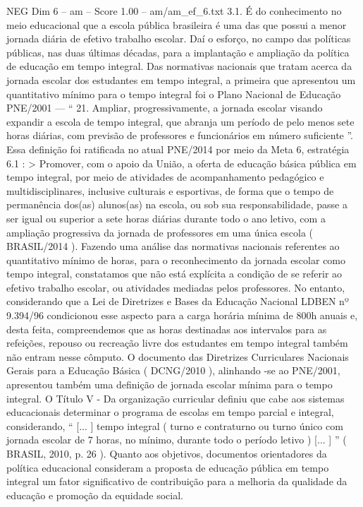 \begin{textsample}{NEG Dim 6 – am – Score 1.00 – am/am\_ef\_6.txt}  \label{ex:f6_neg_029}
3.1.
É do conhecimento no meio educacional que a escola pública brasileira é uma das que possui a menor jornada diária de efetivo trabalho escolar.
Daí o esforço, no campo das políticas públicas, nas duas últimas décadas, para a implantação e ampliação da política de educação em tempo integral.
Das normativas nacionais que tratam acerca da jornada escolar dos estudantes em tempo integral, a primeira que apresentou um quantitativo mínimo para o tempo integral foi o Plano Nacional de Educação PNE/2001 — “ 21.
Ampliar, progressivamente, a jornada escolar visando expandir a escola de tempo integral, que abranja um período de pelo menos sete horas diárias, com previsão de professores e funcionários em número suficiente ”.
Essa definição foi ratificada no atual PNE/2014 por meio da Meta 6, estratégia 6.1 : > Promover, com o apoio da União, a oferta de educação básica pública em tempo integral, por meio de atividades de acompanhamento pedagógico e multidisciplinares, inclusive culturais e esportivas, de forma que o tempo de permanência dos(as) alunos(as) na escola, ou sob sua responsabilidade, passe a ser igual ou superior a sete horas diárias durante todo o ano letivo, com a ampliação progressiva da jornada de professores em uma única escola ( BRASIL/2014 ).
Fazendo uma análise das normativas nacionais referentes ao quantitativo mínimo de horas, para o reconhecimento da jornada escolar como tempo integral, constatamos que não está explícita a condição de se referir ao efetivo trabalho escolar, ou atividades mediadas pelos professores.
No entanto, considerando que a Lei de Diretrizes e Bases da Educação Nacional LDBEN nº 9.394/96 condicionou esse aspecto para a carga horária mínima de 800h anuais e, desta feita, compreendemos que as horas destinadas aos intervalos para as refeições, repouso ou recreação livre dos estudantes em tempo integral também não entram nesse cômputo.
O documento das Diretrizes Curriculares Nacionais Gerais para a Educação Básica ( DCNG/2010 ), alinhando -se ao PNE/2001, apresentou também uma definição de jornada escolar mínima para o tempo integral.
O Título V - Da organização curricular definiu que cabe aos sistemas educacionais determinar o programa de escolas em tempo parcial e integral, considerando, “ [... ] tempo integral ( turno e contraturno ou turno único com jornada escolar de 7 horas, no mínimo, durante todo o período letivo ) [... ] ” ( BRASIL, 2010, p. 26 ).
Quanto aos objetivos, documentos orientadores da política educacional consideram a proposta de educação pública em tempo integral um fator significativo de contribuição para a melhoria da qualidade da educação e promoção da equidade social.

\end{textsample}
